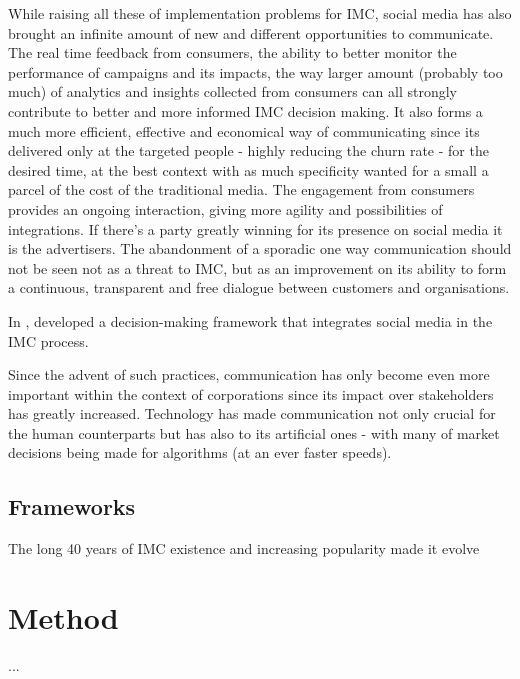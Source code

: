 \documentclass[11pt]{article}
\begin{document}
 While raising all these of implementation problems for IMC, social media has also brought an infinite amount of new and different opportunities to communicate. The real time feedback from consumers, the ability to better monitor the performance of campaigns and its impacts, the way larger amount (probably too much) of analytics and insights collected from consumers can all strongly contribute to better and more informed IMC decision making. It also forms a much more efficient, effective and economical way of communicating since its delivered only at the targeted people - highly reducing the churn rate - for the desired time, at the best context with as much specificity wanted for a small a parcel of the cost of the traditional media. The engagement from consumers provides an ongoing interaction, giving more agility and possibilities of integrations. If there's a party greatly winning for its presence on social media it is the advertisers. The abandonment of a sporadic one way communication should not be seen not as a threat to IMC, but as an improvement on its ability to form a continuous, transparent and free dialogue between customers and organisations.
 
 
 
 In \citeyear{valos}, \citeauthor{valos} developed a decision-making framework that integrates social media in the IMC process. 
 
 
 
 
Since the advent of such practices, communication has only become even more important within the context of corporations since its impact over stakeholders has greatly increased. Technology has made communication not only crucial for the human counterparts but has also to its artificial ones - with many of market decisions being made for algorithms (at an ever faster speeds).  	

 \subsection{Frameworks}
 The long 40 years of IMC existence and increasing popularity made it evolve 
 	
		

\newpage		
\section{Method}\label{method}
...

\cleardoublepage
\newpage	

\printbibliography
\end{document}
